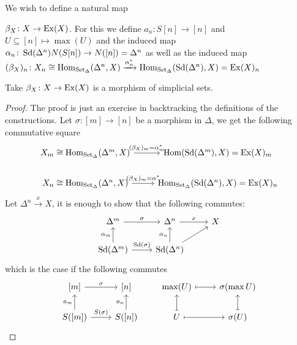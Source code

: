     We wish to define a natural map 
    
    $\beta_X \colon X \to \operatorname{Ex}(X)$. 
    For this we define $a_n \colon S[n] \to [n]$ and $U \subseteq [n] \mapsto \max (U)$ and the induced map 
    $\alpha_n \colon \operatorname{Sd}(\Delta^n) N(S[n]) \to N([n]) = \Delta^n$ as well as the induced map 
    $(\beta_X)_n \colon X_n \cong \operatorname{Hom}_{\operatorname{Set}_{\Delta}}(\Delta^n, X) \xrightarrow{\alpha_n^*} \operatorname{Hom}_{\operatorname{Set}_{\Delta}}(\operatorname{Sd}(\Delta^n),X)=\operatorname{Ex}(X)_n$

\begin{lem}
    Take $\beta_X\colon X \to \operatorname{Ex}(X)$ is a morphism of simplicial sets.
\end{lem}

\begin{proof}
    The proof is just an exercise in backtracking the definitions of the constructions.
    Let $\sigma\colon [m] \to [n]$ be a morphism in $\Delta$, we get the following commutative square
    \[
    \begin{tikzcd}
        X_m \cong \Hom_{\SetD}( \Delta^m,X) 
        \ar[r, "{(\beta_X)_m=\alpha_m^*}"]
        &
        \Hom(\Sd(\Delta^m),X)=\Ex(X)_m
        \\
        X_n \cong \Hom_{\SetD}(\Delta^n,X)
        \ar[r, "(\beta_X)_m=\alpha^*"]
        &
        \Hom_{\SetD}(\Sd(\Delta^n),X)=\Ex(X)_n
    \end{tikzcd}
    \]
    Let $\Delta^n \xrightarrow{x} X$, it is enough to show that the following commutes:
    \[
    \begin{tikzcd}
        \Delta^m
        \ar[r, "\sigma"]
        &
        \Delta^n
        \ar[r, "x"]
        &
        X
        \\
        \Sd(\Delta^m)
        \ar[u, "\alpha_m"]
        \ar[r, "\Sd(\sigma)"]
        &
        \Sd(\Delta^n)
        \ar[u, "\alpha_n"]
        \ar[ru]
    \end{tikzcd}
    \]
    which is the case if the following commutes
    \[
    \begin{tikzcd}
        {[m]}
        \ar[r, "\sigma"]
        &
        {[n]}
        \\
        S([m])
        \ar[u, "a_m"]
        \ar[r, "S(\sigma)"]
        &
        S([n])
        \ar[u, "a_n"]
    \end{tikzcd}
    \qquad
    \begin{tikzcd}
        \max(U)
        \ar[r, mapsto]
        &
        \sigma(\max U)
        \\
        U
        \ar[u,mapsto]
        \ar[r,mapsto]
        &
        \sigma(U)
        \ar[u, mapsto]
    \end{tikzcd}
    \]
\end{proof}

